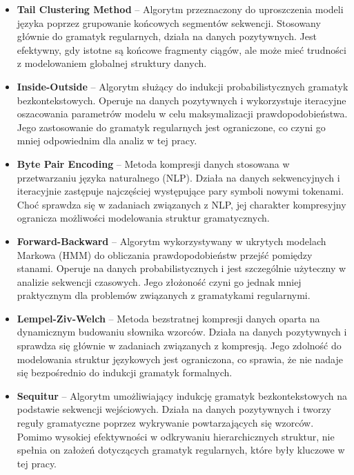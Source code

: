 \begin{itemize}  
    \item \textbf{Tail Clustering Method} – Algorytm przeznaczony do uproszczenia modeli języka poprzez grupowanie końcowych segmentów sekwencji. Stosowany głównie do gramatyk regularnych, działa na danych pozytywnych. Jest efektywny, gdy istotne są końcowe fragmenty ciągów, ale może mieć trudności z modelowaniem globalnej struktury danych.  

    \item \textbf{Inside-Outside} – Algorytm służący do indukcji probabilistycznych gramatyk bezkontekstowych. Operuje na danych pozytywnych i wykorzystuje iteracyjne oszacowania parametrów modelu w celu maksymalizacji prawdopodobieństwa. Jego zastosowanie do gramatyk regularnych jest ograniczone, co czyni go mniej odpowiednim dla analiz w tej pracy.  

    \item \textbf{Byte Pair Encoding} – Metoda kompresji danych stosowana w przetwarzaniu języka naturalnego (NLP). Działa na danych sekwencyjnych i iteracyjnie zastępuje najczęściej występujące pary symboli nowymi tokenami. Choć sprawdza się w zadaniach związanych z NLP, jej charakter kompresyjny ogranicza możliwości modelowania struktur gramatycznych.  

    \item \textbf{Forward-Backward} – Algorytm wykorzystywany w ukrytych modelach Markowa (HMM) do obliczania prawdopodobieństw przejść pomiędzy stanami. Operuje na danych probabilistycznych i jest szczególnie użyteczny w analizie sekwencji czasowych. Jego złożoność czyni go jednak mniej praktycznym dla problemów związanych z gramatykami regularnymi.  

    \item \textbf{Lempel-Ziv-Welch} – Metoda bezstratnej kompresji danych oparta na dynamicznym budowaniu słownika wzorców. Działa na danych pozytywnych i sprawdza się głównie w zadaniach związanych z kompresją. Jego zdolność do modelowania struktur językowych jest ograniczona, co sprawia, że nie nadaje się bezpośrednio do indukcji gramatyk formalnych.  

    \item \textbf{Sequitur} – Algorytm umożliwiający indukcję gramatyk bezkontekstowych na podstawie sekwencji wejściowych. Działa na danych pozytywnych i tworzy reguły gramatyczne poprzez wykrywanie powtarzających się wzorców. Pomimo wysokiej efektywności w odkrywaniu hierarchicznych struktur, nie spełnia on założeń dotyczących gramatyk regularnych, które były kluczowe w tej pracy.  
\end{itemize}  
 


